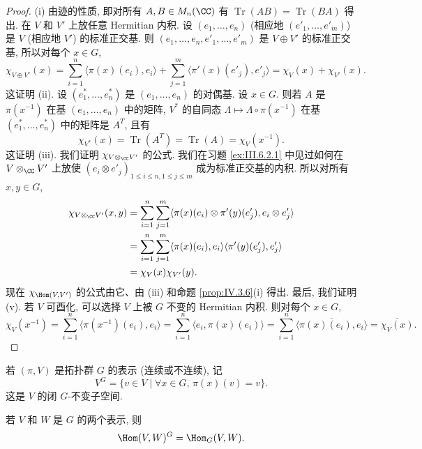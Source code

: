 \begin{proof}
(i) 由迹的性质, 即对所有 $A, B \in M_n(\CC)$ 有 $\operatorname{Tr}(AB) = \operatorname{Tr}(BA)$ 得出.
在 $V$ 和 $V'$ 上放任意 Hermitian 内积. 设 $(e_1, \ldots, e_n)$ (相应地 $(e'_1, \ldots, e'_m)$) 是 $V$ (相应地 $V'$) 的标准正交基. 则 $(e_1, \ldots, e_n, e'_1, \ldots, e'_m)$ 是 $V \oplus V'$ 的标准正交基, 所以对每个 $x \in G$,
\[
\chi_{V \oplus V'}(x) = \sum_{i=1}^n\langle \pi(x)(e_i), e_i \rangle + \sum_{j=1}^m\langle \pi'(x)(e'_j), e'_j \rangle = \chi_V(x) + \chi_{V'}(x).
\]
这证明 (ii).
设 $(e_1^*, \ldots, e_n^*)$ 是 $(e_1, \ldots, e_n)$ 的对偶基. 设 $x \in G$. 则若 $A$ 是 $\pi(x^{-1})$ 在基 $(e_1, \ldots, e_n)$ 中的矩阵, $V^*$ 的自同态 $\Lambda \longmapsto \Lambda \circ \pi(x^{-1})$ 在基 $(e_1^*, \ldots, e_n^*)$ 中的矩阵是 $A^T$, 且有
\[
\chi_{V^*}(x) = \operatorname{Tr}(A^T) = \operatorname{Tr}(A) = \chi_V(x^{-1}).
\]
这证明 (iii).
我们证明 $\chi_{V \otimes_{\CC}V'}$ 的公式. 我们在习题 \ref{ex:III.6.2.1} 中见过如何在 $V \otimes_{\CC}V'$ 上放使 $(e_i \otimes e'_j)_{1 \leq i \leq n, 1 \leq j \leq m}$ 成为标准正交基的内积. 所以对所有 $x, y \in G$,
\begin{align*}
\chi_{V \otimes_{\CC}V'}(x, y) &= \sum_{i=1}^n\sum_{j=1}^m\langle \pi(x)(e_i) \otimes \pi'(y)(e'_j), e_i \otimes e'_j \rangle \\
&= \sum_{i=1}^n\sum_{j=1}^m\langle \pi(x)(e_i), e_i \rangle\langle \pi'(y)(e'_j), e'_j \rangle \\
&= \chi_V(x)\chi_{V'}(y).
\end{align*}
现在 $\chi_{\Hom(V,V')}$ 的公式由它、由 (iii) 和命题 \ref{prop:IV.3.6}(i) 得出.
最后, 我们证明 (v). 若 $V$ 可酉化, 可以选择 $V$ 上被 $G$ 不变的 Hermitian 内积. 则对每个 $x \in G$,
\[
\chi_V(x^{-1}) = \sum_{i=1}^n\langle \pi(x^{-1})(e_i), e_i \rangle = \sum_{i=1}^n\langle e_i, \pi(x)(e_i) \rangle = \sum_{i=1}^n\overline{\langle \pi(x)(e_i), e_i \rangle} = \overline{\chi_V(x)}.
\]
\end{proof}

\begin{notation}[不动点子空间]
\label{not:IV.5.5}
若 $(\pi, V)$ 是拓扑群 $G$ 的表示 (连续或不连续), 记
\[
V^G = \{v \in V \mid \forall x \in G,\, \pi(x)(v) = v\}.
\]
这是 $V$ 的闭 $G$-不变子空间.
\end{notation}

\begin{example}[交错算子作为不动点]
\label{exa:IV.5.6}
若 $V$ 和 $W$ 是 $G$ 的两个表示, 则
\[
\Hom(V, W)^G = \Hom_G(V, W).
\]
\end{example}

